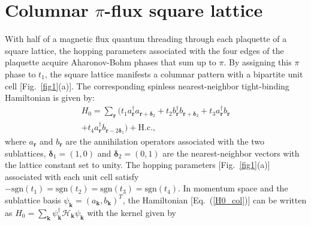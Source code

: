 \documentclass[aps, twocolumn, floatfix, superscriptaddress, prb]{revtex4-1}
\begin{document}
\section{Columnar $\pi$-flux square lattice}
\label{sec2}
With half of a magnetic flux quantum threading through each plaquette of a square lattice, the hopping parameters associated with the four edges of the plaquette acquire Aharonov-Bohm phases that sum up to $\pi$. By assigning this $\pi$ phase to $t_1$, the square lattice manifests a columnar pattern with a bipartite unit cell [Fig.~\ref{fig1}(a)]. The corresponding spinless nearest-neighbor tight-binding Hamiltonian is given by:
%
%
%
\begin{equation} \label{H0_col}
\begin{split}
{
H_0=\sum_{\bm r} (t_1 a_{\bm r}^\dagger a_{\bm r+\bm\delta_2}+t_2 b_{\bm r}^\dagger b_{\bm r+\bm \delta_2} + t_3 a_{\bm r}^\dagger b_{\bm r}
}
\\
{
+ t_4 a_{\bm r}^\dagger b_{\bm r-2\bm \delta_1})+\text{H.c.},
}
\end{split}
\end{equation}
%
where $a_{\bm r}$ and $b_{\bm r}$ are the annihilation operators associated with the two sublattices, $\bm \delta_1=(1,0)$ and $\bm \delta_2=(0,1)$ are the nearest-neighbor vectors with the lattice constant set to unity. The hopping parameters [Fig.~\ref{fig1}(a)] associated with each unit cell satisfy $-\text{sgn}(t_1)=\text{sgn}(t_2)=\text{sgn}(t_3)=\text{sgn}(t_4)$. In momentum space and the sublattice basis $\psi_{\bm k}=(a_{\bm k},b_{\bm k})^{T}$, the Hamiltonian [Eq.~(\ref{H0_col})] can be written as $H_0=\sum_{\bm k} \psi_{\bm k}^{\dagger}\mathcal{H}_{\bm k}\psi_{\bm k}$ with the kernel given by
\end{document}
